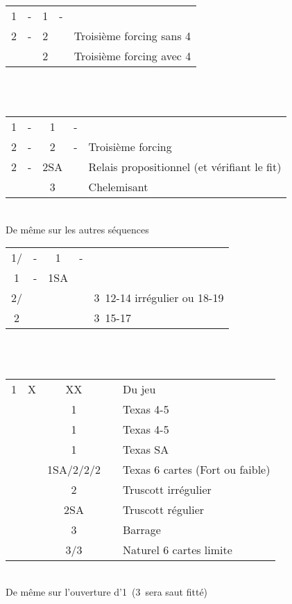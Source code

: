 \documentclass[a4paper, oneside, 11pt]{report}
\begin{document}
		\begin{tabular}{cccc|l}
		1\trefle & - & 1\pique & - &\\
		2\trefle & - & 2\carreau && Troisième forcing sans 4\coeur\\
		&& 2\coeur && Troisième forcing avec 4\coeur\\
		\end{tabular}\\\\
			
		\begin{tabular}{cccc|l}
		1\trefle & - & 1\coeur & - &\\
		2\trefle & - & 2\carreau & - & Troisième forcing\\
		2\coeur & - & 2SA && Relais propositionnel (et vérifiant le fit)\\
		&& 3\coeur &&Chelemisant\\
		\end{tabular}\\
		De même sur les autres séquences

		\begin{tabular}{cccc|l}
		1\trefle/\carreau & - & 1\coeur & - &\\
		1\pique  & - & 1SA &&\\
		2\carreau/\trefle &&&& 3\coeur\ 12-14 irrégulier ou 18-19\\
		2\coeur &&&& 3\coeur\ 15-17\\
		\end{tabular}\\\\

		\begin{tabular}{cccc|l}
		1\trefle & X & XX && Du jeu\\
		&& 1\carreau && Texas 4-5\coeur\\
		&& 1\coeur && Texas 4-5\pique\\
		&& 1\pique && Texas SA\\
		&& 1SA/2\trefle/2\carreau/2\coeur && Texas 6 cartes (Fort ou faible)\\
		&& 2\pique && Truscott irrégulier\\
		&& 2SA && Truscott régulier\\
		&& 3\trefle && Barrage\\
		&& 3\coeur/3\pique && Naturel 6 cartes limite\\
		\end{tabular}\\
		De même sur l'ouverture d'1\carreau\ (3\trefle\ sera saut fitté)\\
\end{document}
